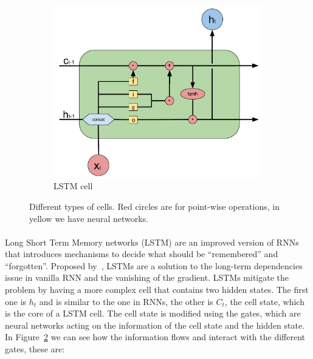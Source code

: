 \begin{figure}[]
\begin{subfigure}[t]{0.5\textwidth}
    \end{subfigure}%
    ~ 
    \begin{subfigure}[t]{0.5\textwidth}
        \centering
        \includegraphics[width=\textwidth]{images/LSTM_cell_simple.pdf}
        \caption{LSTM cell}
        \label{subfig:lstm_cell}

    \end{subfigure}
    \caption{Different types of cells. Red circles are for point-wise operations, in yellow we have neural networks.} %
    \label{fig:cells}
\end{figure} 

\paragraph{}
Long Short Term Memory networks (LSTM) are an improved version of RNNs  that introduces mechanisms to decide what should be ``remembered'' and ``forgotten''. Proposed by~\cite{hochreiter1997long}, LSTMs are a solution to the long-term dependencies issue in vanilla RNN and the vanishing of the gradient. LSTMs mitigate the problem by having a more complex cell that contains two hidden states. The first one is $h_t$ and is similar to the one in RNNs, the other is $C_t$, the cell state, which is the core of a LSTM cell. The cell state is modified using the gates, which are neural networks acting on the information of the cell state and the hidden state. In Figure~\ref{fig:cells} we can see how the information flows and interact with the different gates, these are:

